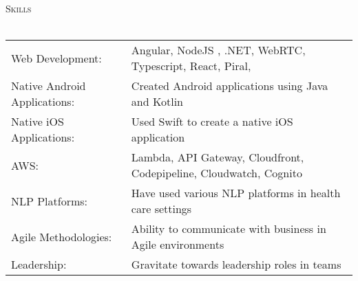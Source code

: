 \documentclass[a4paper]{article}
\newcommand{\lineunder} {
    \vspace*{-8pt} \\
    \hspace*{-18pt} \hrulefill \\
}
\newcommand{\header} [1] {
    {\hspace*{-18pt}\vspace*{6pt} \textsc{#1}}
    \vspace*{-6pt} \lineunder
}
\begin{document}
\header{Skills}
\begin{tabular}{ l l }
	Web Development:                    & Angular, NodeJS , .NET, WebRTC, Typescript, React, Piral, 
\\
	Native Android Applications:        & Created Android applications using Java and Kotlin                                                                                                \\
	Native iOS Applications:            & Used Swift to create a native iOS application                                                                                                     \\
	AWS:                                & Lambda, API Gateway, Cloudfront, Codepipeline, Cloudwatch, Cognito                                                          \\
	NLP Platforms:                      & Have used various NLP platforms in health care settings 
\\
	Agile Methodologies: 				& Ability to communicate with business in Agile environments
\\
	Leadership:                         & Gravitate towards leadership roles in teams 
\\
\end{tabular}
\vspace{2mm}

\end{document}
